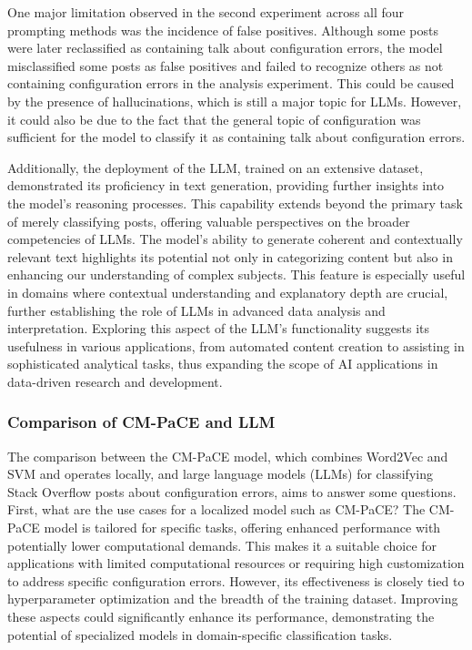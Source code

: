 \documentclass[english,bachelor]{swsLeipzig}
\begin{document}
One major limitation observed in the second experiment across all four prompting methods was the 
incidence of false positives. Although some posts were later reclassified as containing talk about configuration errors, the model misclassified some posts as false positives and failed to recognize others as not containing configuration errors in the analysis experiment. This could be caused by the presence of hallucinations, which is still a major topic for LLMs. However, it could also be due to the fact that the general topic of configuration was sufficient for the model to classify it as containing talk about configuration errors.

Additionally, the deployment of the LLM, trained on an extensive dataset, demonstrated its proficiency 
in text generation, providing further insights into the model's reasoning processes. This capability extends beyond the primary task of merely classifying posts, offering valuable perspectives on the broader competencies of LLMs. The model's ability to generate coherent and contextually relevant text highlights its potential not only in categorizing content but also in enhancing our understanding of complex subjects. This feature is especially useful in domains where contextual understanding and explanatory depth are crucial, further establishing the role of LLMs in advanced data analysis and interpretation. Exploring this aspect of the LLM's functionality suggests its usefulness in various applications, from automated content creation to assisting in sophisticated analytical tasks, thus expanding the scope of AI applications in data-driven research and development.

\subsubsection{Comparison of CM-PaCE and LLM}

The comparison between the CM-PaCE model, which combines Word2Vec and SVM and operates locally, and 
large language models (LLMs) for classifying Stack Overflow posts about configuration errors, aims to answer some questions. First, what are the use cases for a localized model such as CM-PaCE? The CM-PaCE model is tailored for specific tasks, offering enhanced performance with potentially lower computational demands. This makes it a suitable choice for applications with limited computational resources or requiring high customization to address specific configuration errors. However, its effectiveness is closely tied to hyperparameter optimization and the breadth of the training dataset. Improving these aspects could significantly enhance its performance, demonstrating the potential of specialized models in domain-specific classification tasks.
\end{document}

